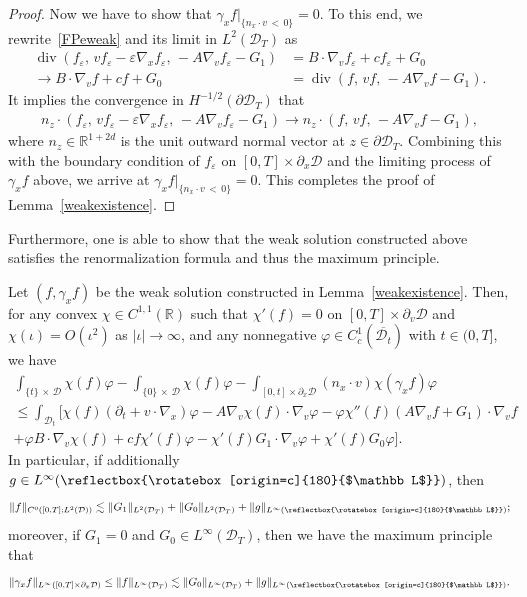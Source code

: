 \documentclass[AHL,Unicode,longabstracts,published]{cedram}
\renewcommand*\div{\operatorname{div}}
\newcommand*\p{\partial}
\newcommand*\R {\mathbb{R}}
\newcommand*\D {\mathcal{D}}
\newcommand\GG{\reflectbox{\rotatebox[origin=c]{180}{$\mathbb L$}}}
\begin{document}
\begin{proof}
Now we have to show that $\gamma_xf|_{\{n_x\cdot v\,<\,0\}}=0$. To this end, we rewrite~\eqref{FPeweak} and its limit in $L^2(\D_T)$ as
\begin{align*}
\div\left(f_\varepsilon,\, vf_\varepsilon-\varepsilon\nabla_xf_\varepsilon,\, -A\nabla_v f_\varepsilon -G_1\right) &= B\cdot\nabla_vf_\varepsilon +cf_\varepsilon+G_0\\
\rightarrow B\cdot\nabla_vf +cf+G_0 &=\div\left(f,\, vf,\, -A\nabla_v f -G_1\right) .
\end{align*}
It implies the convergence in $H^{-1/2}(\p\D_T)$ that
\begin{align*}
n_z\cdot\left(f_\varepsilon,\,vf_\varepsilon - \varepsilon\nabla_xf_\varepsilon,\,-A\nabla_v f_\varepsilon -G_1\right)
\rightarrow n_z\cdot\left(f,\,vf,\,-A\nabla_v f -G_1\right),
\end{align*}
where $n_z\in\R^{1+2d}$ is the unit outward normal vector at $z\in\p\D_T$. Combining this with the boundary condition of $f_\varepsilon$ on $[0,T]\times\p_x\D$ and the limiting process of $\gamma_xf$ above, we arrive at $\gamma_xf|_{\{n_x\cdot v\,<\,0\}}=0$. This completes the proof of Lemma~\ref{weakexistence}.
\end{proof}

Furthermore, one is able to show that the weak solution constructed above satisfies the renormalization formula and thus the maximum principle.

\begin{lemm}\label{max}
Let $(f,\gamma_xf)$ be the weak solution constructed in Lemma~\ref{weakexistence}. Then, for any convex $\chi\in C^{1,1}(\R)$ such that $\chi'(f)=0$ on $[0,T]\times\p_v\D$ and $\chi(\iota)=O(\iota^2)$ as $|\iota|\rightarrow\infty$, and any nonnegative $\varphi\in C^1_c(\overline{\D_t})$ with $t\in(0,T]$, we have
\begin{multline}\label{rene}
\int_{\{t\}\,\times\,\D}\chi(f)\varphi-\int_{\{0\}\,\times\,\D}\chi(f)\varphi -\int_{[0,t]\times\p_x\D}(n_x\cdot v)\chi(\gamma_xf)\varphi\\
\le \int_{\D_t} \big[\chi(f)(\p_t+v\cdot\nabla_x)\varphi -A\nabla_v\chi(f) \cdot\nabla_v\varphi - \varphi\chi''(f)(A\nabla_vf+G_1)\cdot\nabla_vf\\
+ \varphi B\cdot\nabla_v\chi(f) + c f\chi'(f)\varphi -\chi'(f) G_1\cdot\nabla_v\varphi + \chi'(f)G_0\varphi\big].
\end{multline}
In particular, if additionally $g\in L^\infty(\GG)$, then
\begin{equation}\label{maxl2}
\|f\|_{C^0\left([0,T];L^2(\D)\right)}\lesssim \|G_1\|_{L^2(\D_T)} +\|G_0\|_{L^2(\D_T)} +\|g\|_{L^\infty\left(\small\GG\right)};
\end{equation}
moreover, if $G_1=0$ and $G_0\in L^\infty(\D_T)$, then we have the maximum principle that
\begin{equation}\label{maxgg}
\|\gamma_xf\|_{L^\infty\left([0,T]\times\p_x\D\right)}
\le \|f\|_{L^\infty(\D_T)}
\lesssim \|G_0\|_{L^\infty(\D_T)} +\|g\|_{L^\infty\left(\small\GG\right)}.
\end{equation}
\end{lemm}
\end{document}

